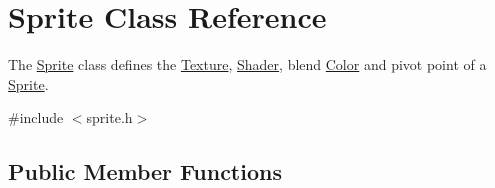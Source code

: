 \hypertarget{class_sprite}{}\section{Sprite Class Reference}
\label{class_sprite}


The \hyperlink{class_sprite}{Sprite} class defines the \hyperlink{class_texture}{Texture}, \hyperlink{class_shader}{Shader}, blend \hyperlink{struct_color}{Color} and pivot point of a \hyperlink{class_sprite}{Sprite}.  




{\ttfamily \#include $<$sprite.\+h$>$}

\subsection*{Public Member Functions}
